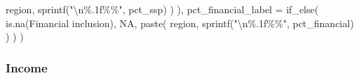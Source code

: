 \documentclass[
  letterpaper,
  DIV=11,
  numbers=noendperiod]{scrartcl}
\newenvironment{Shaded}{}{}
\newcommand{\AttributeTok}[1]{\textcolor[rgb]{0.84,0.23,0.29}{#1}}
\newcommand{\ConstantTok}[1]{\textcolor[rgb]{0.00,0.36,0.77}{#1}}
\newcommand{\FunctionTok}[1]{\textcolor[rgb]{0.44,0.26,0.76}{#1}}
\newcommand{\NormalTok}[1]{\textcolor[rgb]{0.14,0.16,0.18}{#1}}
\newcommand{\SpecialCharTok}[1]{\textcolor[rgb]{0.00,0.36,0.77}{#1}}
\newcommand{\StringTok}[1]{\textcolor[rgb]{0.01,0.18,0.38}{#1}}
\begin{document}
\begin{Shaded}
\begin{Highlighting}[]
\NormalTok{        region,}
        \FunctionTok{sprintf}\NormalTok{(}\StringTok{"}\SpecialCharTok{\textbackslash{}n}\StringTok{\%.1f\%\%"}\NormalTok{, pct\_ssp)}
\NormalTok{      ) }
\NormalTok{    ),}
    \AttributeTok{pct\_financial\_label =} \FunctionTok{if\_else}\NormalTok{(}
      \FunctionTok{is.na}\NormalTok{(}\StringTok{\textasciigrave{}}\AttributeTok{Financial inclusion}\StringTok{\textasciigrave{}}\NormalTok{), }
      \ConstantTok{NA}\NormalTok{, }
      \FunctionTok{paste}\NormalTok{(}
\NormalTok{        region,}
        \FunctionTok{sprintf}\NormalTok{(}\StringTok{"}\SpecialCharTok{\textbackslash{}n}\StringTok{\%.1f\%\%"}\NormalTok{, pct\_financial)}
\NormalTok{      ) }
\NormalTok{    )}
\NormalTok{  )}
\end{Highlighting}
\end{Shaded}

\subsubsection{Income}\label{income-1}
\end{document}
